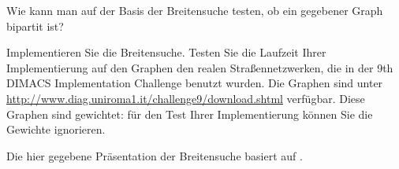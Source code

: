 \begin{aufg} 
	Wie kann man auf der Basis der Breitensuche testen, ob ein gegebener Graph bipartit ist? 
\end{aufg} 

\begin{aufg}
	Implementieren Sie die Breitensuche. Testen Sie die Laufzeit Ihrer Implementierung auf den Graphen den realen Straßennetzwerken, die in der 9th DIMACS Implementation Challenge benutzt wurden. Die Graphen sind unter 
	\url{http://www.diag.uniroma1.it/challenge9/download.shtml}  verfügbar. Diese Graphen sind gewichtet: für den Test Ihrer Implementierung können Sie die Gewichte ignorieren. 
\end{aufg} 

\begin{bem}
	Die hier gegebene Präsentation der Breitensuche basiert auf \cite{CLRS17}. 
\end{bem} 
